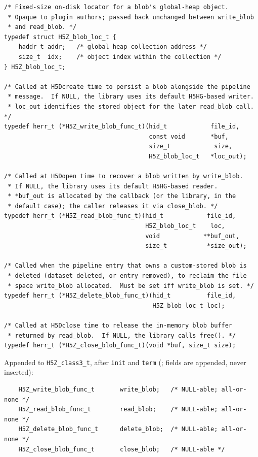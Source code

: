 \documentclass[../RFC-HDFG-2026-003.tex]{subfiles}
\begin{document}
\begin{verbatim}
/* Fixed-size on-disk locator for a blob's global-heap object.
 * Opaque to plugin authors; passed back unchanged between write_blob
 * and read_blob. */
typedef struct H5Z_blob_loc_t {
    haddr_t addr;   /* global heap collection address */
    size_t  idx;    /* object index within the collection */
} H5Z_blob_loc_t;

/* Called at H5Dcreate time to persist a blob alongside the pipeline
 * message.  If NULL, the library uses its default H5HG-based writer.
 * loc_out identifies the stored object for the later read_blob call. */
typedef herr_t (*H5Z_write_blob_func_t)(hid_t            file_id,
                                        const void       *buf,
                                        size_t            size,
                                        H5Z_blob_loc_t   *loc_out);

/* Called at H5Dopen time to recover a blob written by write_blob.
 * If NULL, the library uses its default H5HG-based reader.
 * *buf_out is allocated by the callback (or the library, in the
 * default case); the caller releases it via close_blob. */
typedef herr_t (*H5Z_read_blob_func_t)(hid_t            file_id,
                                       H5Z_blob_loc_t    loc,
                                       void            **buf_out,
                                       size_t           *size_out);

/* Called when the pipeline entry that owns a custom-stored blob is
 * deleted (dataset deleted, or entry removed), to reclaim the file
 * space write_blob allocated.  Must be set iff write_blob is set. */
typedef herr_t (*H5Z_delete_blob_func_t)(hid_t          file_id,
                                         H5Z_blob_loc_t loc);

/* Called at H5Dclose time to release the in-memory blob buffer
 * returned by read_blob.  If NULL, the library calls free(). */
typedef herr_t (*H5Z_close_blob_func_t)(void *buf, size_t size);
\end{verbatim}

Appended to \texttt{H5Z\_class3\_t}, after \texttt{init} and
\texttt{term} (; fields are appended, never
inserted):

\begin{verbatim}
    H5Z_write_blob_func_t       write_blob;   /* NULL-able; all-or-none */
    H5Z_read_blob_func_t        read_blob;    /* NULL-able; all-or-none */
    H5Z_delete_blob_func_t      delete_blob;  /* NULL-able; all-or-none */
    H5Z_close_blob_func_t       close_blob;   /* NULL-able */
\end{verbatim}
\end{document}
